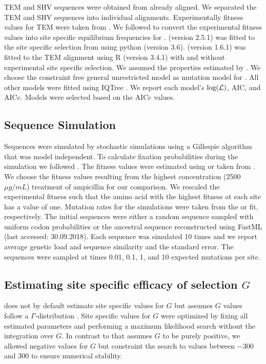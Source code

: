TEM and SHV sequences were obtained from \citet{bloom2017} already aligned.
We separated the TEM and SHV sequences into individual alignments.
Experimentally fitness values for TEM were taken from \citet{stiffler2016}.
We followed \citep{bloom2017} to convert the experimental fitness values into site specific equilibrium frequencies for \phydms. 
\phydms (version 2.5.1) was fitted to the site specific selection from \citet{stiffler2016} using python (version 3.6).
\selac (version 1.6.1) was fitted to the TEM alignment using R (version 3.4.1) \citep{rcore} with and without experimental site specific selection.
We assumed the \PC properties estimated by \citet{grantham1974}.
We choose the constraint free general unrestricted model \citep{yang1994} as mutation model for \selac.
All other models were fitted using IQTree \citep{nguyen2015}.
We report each model's $\log(\mathcal{L})$, AIC, and  AICc. 
Models were selected based on the AICc values.

\subsection{Sequence Simulation}

Sequences were simulated by stochastic simulations using a Gillespie algorithm \citep{gillespie1976} that was model independent.
To calculate fixation probabilities during the simulation we followed \citet{SellaAndHirsh2005}.
The fitness values were estimated using \selac or taken from \citet{stiffler2016}.
We choose the fitness values resulting from the highest concentration (2500 $\mu g/mL$) treatment of ampicillin for our comparison.
We rescaled the experimental fitness such that the amino acid with the highest fitness at each site has a value of one.
Mutation rates for the simulations were taken from the \selac or \selacDMS fit, respectively.
The initial sequences were either a random sequence sampled with uniform codon probabilities or the ancestral sequence reconstructed using FastML \citep{fastml} (last accessed: 30.09.2018).
Each sequence was simulated 10 times and we report average genetic load and sequence similarity and the standard error.
The sequences were sampled at times 0.01, 0.1, 1, and 10 expected mutations per site.

\subsection{Estimating site specific efficacy of selection $G$}

\selac does not by default estimate site specific values for $G$ but assumes $G$ values follow a $\Gamma$-distribution \citep{Felsenstein2001}.
Site specific values for $G$ were optimized by fixing all estimated parameters and performing a maximum likelihood search without the integration over $G$.
In contrast to \selac that assumes $G$ to be purely positive, we allowed negative values for $G$ but constraint the search to values between $-300$ and $300$ to ensure numerical stability.

